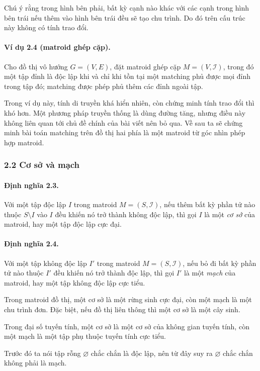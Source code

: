 \documentclass[11pt]{article}
\begin{document}
Chú ý rằng trong hình bên phải, bất kỳ cạnh nào khác với các cạnh trong hình
bên trái nếu thêm vào hình bên trái đều sẽ tạo chu trình. Do đó trên cấu trúc
này không có tính trao đổi.

\paragraph{Ví dụ 2.4 (matroid ghép cặp).}
Cho đồ thị vô hướng \(G=(V,E)\), đặt matroid ghép cặp \(M=(V,\mathcal I)\), trong
đó một tập đỉnh là độc lập khi và chỉ khi tồn tại một matching phủ được mọi đỉnh
trong tập đó; matching được phép phủ thêm các đỉnh ngoài tập.

Trong ví dụ này, tính di truyền khá hiển nhiên, còn chứng minh tính trao đổi thì
khó hơn. Một phương pháp truyền thống là dùng đường tăng, nhưng điều này không
liên quan tới chủ đề chính của bài viết nên bỏ qua. Về sau ta sẽ chứng minh bài
toán matching trên đồ thị hai phía là một matroid từ góc nhìn phép hợp matroid.

\subsubsection*{2.2 Cơ sở và mạch}

\paragraph{Định nghĩa 2.3.}
Với một tập độc lập \(I\) trong matroid \(M=(S,\mathcal I)\), nếu thêm bất kỳ
phần tử nào thuộc \(S\setminus I\) vào \(I\) đều khiến nó trở thành không độc
lập, thì gọi \(I\) là một \emph{cơ sở} của matroid, hay một tập độc lập cực đại.

\paragraph{Định nghĩa 2.4.}
Với một tập không độc lập \(I'\) trong matroid \(M=(S,\mathcal I)\), nếu bỏ đi
bất kỳ phần tử nào thuộc \(I'\) đều khiến nó trở thành độc lập, thì gọi \(I'\)
là một \emph{mạch} của matroid, hay một tập không độc lập cực tiểu.

Trong matroid đồ thị, một cơ sở là một rừng sinh cực đại, còn một mạch là một
chu trình đơn. Đặc biệt, nếu đồ thị liên thông thì một cơ sở là một cây sinh.

Trong đại số tuyến tính, một cơ sở là một cơ sở của không gian tuyến tính, còn
một mạch là một tập phụ thuộc tuyến tính cực tiểu.

Trước đó ta nói tập rỗng \(\varnothing\) chắc chắn là độc lập, nên từ đây suy
ra \(\varnothing\) chắc chắn không phải là mạch.
\end{document}
